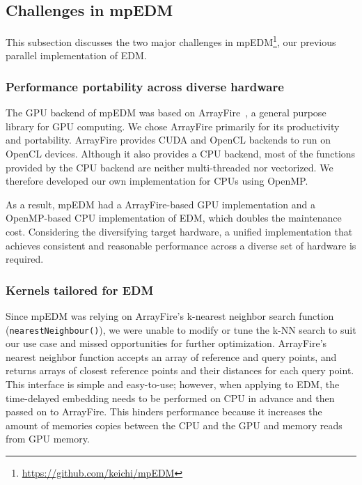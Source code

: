 \documentclass[sigconf]{acmart}
\begin{document}
\subsection{Challenges in mpEDM}\label{sec:challenges}

This subsection discusses the two major challenges in
mpEDM\footnote{\url{https://github.com/keichi/mpEDM}}, our previous
parallel implementation of EDM\@.

\subsubsection{Performance portability across diverse hardware}\label{sec:portability}

The GPU backend of mpEDM was based on ArrayFire~\cite{Malcolm2012}, a general
purpose library for GPU computing. We chose ArrayFire primarily for its
productivity and portability. ArrayFire provides CUDA and OpenCL backends to
run on OpenCL devices. Although it also provides a CPU backend, most of the
functions provided by the CPU backend are neither multi-threaded nor
vectorized. We therefore developed our own implementation for CPUs
using OpenMP\@.

As a result, mpEDM had a ArrayFire-based GPU implementation and a OpenMP-based
CPU implementation of EDM, which doubles the maintenance cost. Considering the
diversifying target hardware, a unified implementation that achieves
consistent and reasonable performance across a diverse set of hardware is
required.

\subsubsection{Kernels tailored for EDM}\label{sec:flexibility}

Since mpEDM was relying on ArrayFire's k-nearest neighbor search function
(\texttt{nearestNeighbour()}), we were unable to modify or tune the k-NN
search to suit our use case and missed opportunities for further optimization.
ArrayFire's nearest neighbor function accepts an array of reference and query
points, and returns arrays of closest reference points and their distances
for each query point. This interface is simple and easy-to-use; however, when
applying to EDM, the time-delayed embedding needs to be performed on CPU in
advance and then passed on to ArrayFire. This hinders performance because it
increases the amount of memories copies between the CPU and the
GPU and memory reads from GPU memory.
\end{document}
